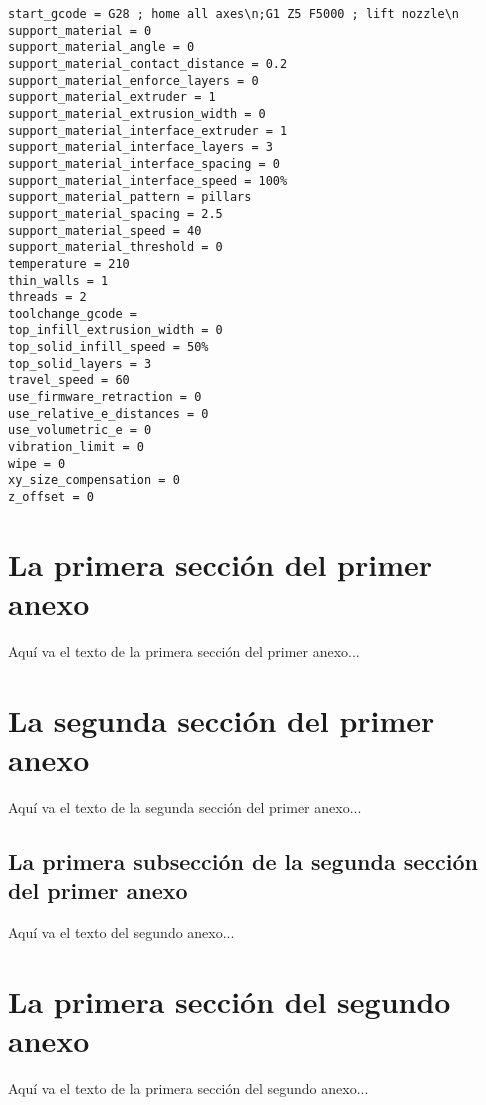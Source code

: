 \documentclass{iccmemoria}
\begin{document}
\begin{verbatim}
start_gcode = G28 ; home all axes\n;G1 Z5 F5000 ; lift nozzle\n
support_material = 0
support_material_angle = 0
support_material_contact_distance = 0.2
support_material_enforce_layers = 0
support_material_extruder = 1
support_material_extrusion_width = 0
support_material_interface_extruder = 1
support_material_interface_layers = 3
support_material_interface_spacing = 0
support_material_interface_speed = 100%
support_material_pattern = pillars
support_material_spacing = 2.5
support_material_speed = 40
support_material_threshold = 0
temperature = 210
thin_walls = 1
threads = 2
toolchange_gcode = 
top_infill_extrusion_width = 0
top_solid_infill_speed = 50%
top_solid_layers = 3
travel_speed = 60
use_firmware_retraction = 0
use_relative_e_distances = 0
use_volumetric_e = 0
vibration_limit = 0
wipe = 0
xy_size_compensation = 0
z_offset = 0
\end{verbatim}

\section{La primera sección del primer anexo}
Aquí va el texto de la primera sección del primer anexo...

\section{La segunda sección del primer anexo}
Aquí va el texto de la segunda sección del primer anexo...

\subsection{La primera subsección de la segunda sección del primer anexo}


Aquí va el texto del segundo anexo...

\section{La primera sección del segundo anexo}
Aquí va el texto de la primera sección del segundo anexo...

\end{document}
